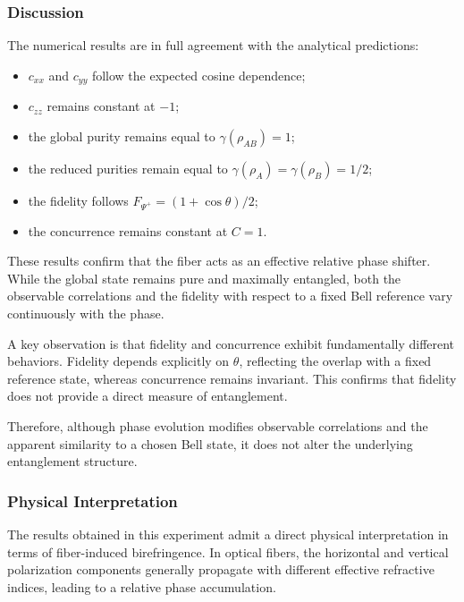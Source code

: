 \documentclass[a4paper]{article}
\begin{document}

\subsubsection{Discussion}

The numerical results are in full agreement with the analytical predictions:
\begin{itemize}
\item \(c_{xx}\) and \(c_{yy}\) follow the expected cosine dependence;
\item \(c_{zz}\) remains constant at \(-1\);
\item the global purity remains equal to \(\gamma(\rho_{AB})=1\);
\item the reduced purities remain equal to \(\gamma(\rho_A)=\gamma(\rho_B)=1/2\);
\item the fidelity follows \(F_{\Psi^+}=(1+\cos\theta)/2\);
\item the concurrence remains constant at \(C=1\).
\end{itemize}

These results confirm that the fiber acts as an effective relative phase shifter. While the global state remains pure and maximally entangled, both the observable correlations and the fidelity with respect to a fixed Bell reference vary continuously with the phase.

A key observation is that fidelity and concurrence exhibit fundamentally different behaviors. Fidelity depends explicitly on \( \theta \), reflecting the overlap with a fixed reference state, whereas concurrence remains invariant. This confirms that fidelity does not provide a direct measure of entanglement.

Therefore, although phase evolution modifies observable correlations and the apparent similarity to a chosen Bell state, it does not alter the underlying entanglement structure.


\subsubsection{Physical Interpretation}

The results obtained in this experiment admit a direct physical interpretation in terms of fiber-induced birefringence. In optical fibers, the horizontal and vertical polarization components generally propagate with different effective refractive indices, leading to a relative phase accumulation.
\end{document}
